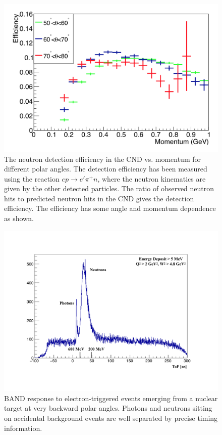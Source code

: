 \documentclass[final,3p]{elsarticle}
\begin{document}
\begin{twocolumn}
\begin{figure}[th!]
\centerline{\includegraphics[width=1.0\columnwidth]{cnd-neutron-efficiency.png}}
\caption{The neutron detection efficiency in the CND vs. momentum for different polar angles. The detection efficiency
  has been measured using the reaction $e p \to e' \pi^+ n$, where the neutron kinematics are given by the other
  detected particles. The ratio of observed neutron hits to predicted neutron hits in the CND gives the detection
  efficiency. The efficiency has some angle and momentum dependence as shown.} 
\label{CND-neutron-efficiency}
\end{figure} 

\begin{figure}[th!]
\centerline{\includegraphics[width=1.2\columnwidth]{BAND-performance.pdf}}
\caption{BAND response to electron-triggered events emerging from a nuclear target at very backward polar angles.
  Photons and neutrons sitting on accidental background events are well separated by precise timing information.} 
\label{BAND-performance}
\end{figure} 


\end{twocolumn}
\end{document}
